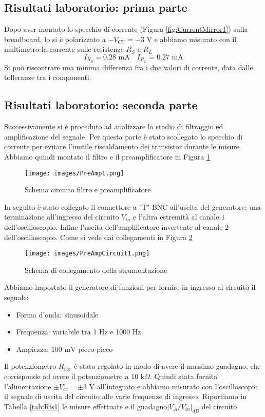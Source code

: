 \subsection{Risultati laboratorio: prima parte}
Dopo aver montato lo specchio di corrente (Figura \ref{fig:CurrentMirror1}) sulla breadboard, lo si è polarizzato a $-V_{CC}=-3\text{ V}$ e abbiamo misurato con il multimetro la corrente sulle resistenze $R_S$ e $R_L$
\begin{equation*}
    I_{R_S}=0.28\text{ mA}\quad I_{R_L}=0.27\text{ mA}
\end{equation*}
Si può riscontrare una minima differenza fra i due valori di corrente, data dalle tolleranze tra i componenti.
\clearpage
\subsection{Risultati laboratorio: seconda parte}
Successivamente si è proceduto ad analizzare lo stadio di filtraggio ed amplificazione del segnale. Per questa parte è stato scollegato lo specchio di corrente per evitare l'inutile riscaldamento dei transistor durante le misure. Abbiamo quindi montato il filtro e il preamplificatore in Figura \ref{fig:PreAmp1}
\begin{figure}[H]
    \centering
    \texttt{[image: images/PreAmp1.png]}
    \caption{Schema circuito filtro e preamplificatore}
    \label{fig:PreAmp1}
\end{figure}
In seguito è stato collegato il connettore a "T" BNC all'uscita del generatore; una terminazione all'ingresso del circuito  $V_{in}$ e l'altra estremità al canale 1 dell'oscilloscopio. Infine l'uscita dell'amplificatore invertente al canale 2 dell'oscilloscopio. Come si vede dai collegamenti in Figura \ref{fig:PreAmpCircuit1}
\begin{figure}[H]
    \centering
    \texttt{[image: images/PreAmpCircuit1.png]}
    \caption{Schema di collegamento della strumentazione}
    \label{fig:PreAmpCircuit1}
\end{figure}
\noindent Abbiamo impostato il generatore di funzioni per fornire in ingresso al circuito il segnale:
\begin{itemize}
    \item Forma d'onda: sinusoidale
    \item Frequenza: variabile tra 1 Hz e 1000 Hz
    \item Ampiezza: $100\text{ mV}$ picco-picco
\end{itemize}
Il potenziometro $R_{var}$ è stato regolato in modo di avere il massimo guadagno, che corrisponde ad avere il potenziometro a $10\text{ k}\Omega$. Quindi stata fornita l'alimentazione $\pm V_{cc}=\pm3\text{ V}$ all'integrato e abbiamo misurato con l'oscilloscopio il segnale di uscita del circuito alle varie frequenze di ingresso. Riportiamo in Tabella \ref{tab:Ris1} le misure effettuate e il guadagno$\left|V_A/V_{in}\right|_{dB}$ del circuito.
